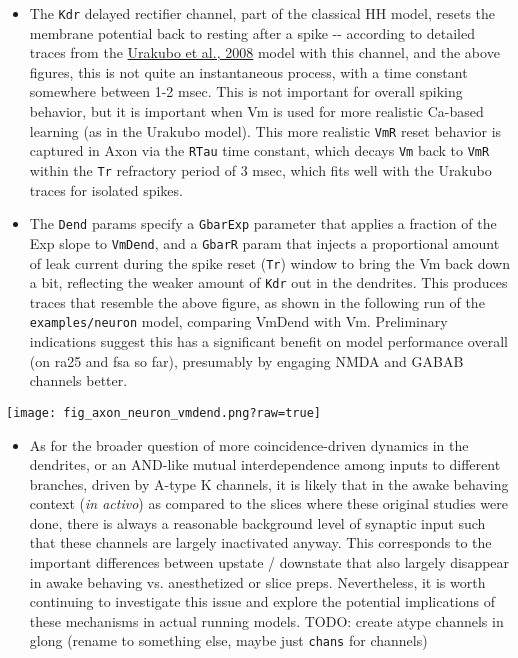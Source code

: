 \documentclass[11pt,twoside]{article}
\newif\myifpdf
\begin{document}
\begin{itemize}
\item
  The \texttt{Kdr} delayed rectifier channel, part of the classical HH
  model, resets the membrane potential back to resting after a spike
  -\/- according to detailed traces from the
  \href{https://github.com/ccnlab/kinase/tree/main/sims/urakubo}{Urakubo
  et al., 2008} model with this channel, and the above figures, this is
  not quite an instantaneous process, with a time constant somewhere
  between 1-2 msec. This is not important for overall spiking behavior,
  but it is important when Vm is used for more realistic Ca-based
  learning (as in the Urakubo model). This more realistic \texttt{VmR}
  reset behavior is captured in Axon via the \texttt{RTau} time
  constant, which decays \texttt{Vm} back to \texttt{VmR} within the
  \texttt{Tr} refractory period of 3 msec, which fits well with the
  Urakubo traces for isolated spikes.
\item
  The \texttt{Dend} params specify a \texttt{GbarExp} parameter that
  applies a fraction of the Exp slope to \texttt{VmDend}, and a
  \texttt{GbarR} param that injects a proportional amount of leak
  current during the spike reset (\texttt{Tr}) window to bring the Vm
  back down a bit, reflecting the weaker amount of \texttt{Kdr} out in
  the dendrites. This produces traces that resemble the above figure, as
  shown in the following run of the \texttt{examples/neuron} model,
  comparing VmDend with Vm. Preliminary indications suggest this has a
  significant benefit on model performance overall (on ra25 and fsa so
  far), presumably by engaging NMDA and GABAB channels better.
\end{itemize}

\texttt{[image: fig\_axon\_neuron\_vmdend.png?raw=true]}

\begin{itemize}
\tightlist
\item
  As for the broader question of more coincidence-driven dynamics in the
  dendrites, or an AND-like mutual interdependence among inputs to
  different branches, driven by A-type K channels, it is likely that in
  the awake behaving context (\emph{in activo}) as compared to the
  slices where these original studies were done, there is always a
  reasonable background level of synaptic input such that these channels
  are largely inactivated anyway. This corresponds to the important
  differences between upstate / downstate that also largely disappear in
  awake behaving vs. anesthetized or slice preps. Nevertheless, it is
  worth continuing to investigate this issue and explore the potential
  implications of these mechanisms in actual running models. TODO:
  create atype channels in glong (rename to something else, maybe just
  \texttt{chans} for channels)
\end{itemize}
\end{document}
